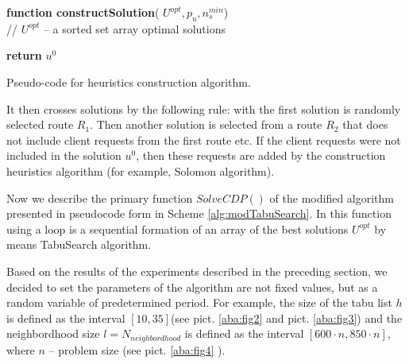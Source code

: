 \documentclass[]{TAACpaper}
\begin{document}
\begin{algorithm}[H]

	\textbf{function constructSolution}( $U^{opt}, p_u, n^{min}_s$) \\
	// $U^{opt}$ -- a sorted set array optimal solutions \\
	
	
	
	
	
	\textbf{return} $u^0$
	
	\caption{Pseudo-code for heuristics construction algorithm.}
	\label{alg:constructSolution}
\end{algorithm}

It then crosses solutions by the following rule: with the first solution is randomly selected route $R_1$. Then another solution is selected from a route $R_2$ that does not include client requests from the first  route etc. If the client requests were not included in the solution $u^0$, then these requests are added by the construction heuristics algorithm (for example, Solomon algorithm).


Now we describe the primary function $SolveCDP()$ of the modified algorithm presented in pseudocode form in Scheme \ref{alg:modTabuSearch}. In this function using a loop is a sequential formation of an array of the best solutions $U^{opt}$ by means TabuSearch algorithm.   

Based on the results of the experiments described in the preceding section, we decided to set the parameters of the algorithm are not fixed values, but as a random variable of predetermined period. For example, the size of the tabu list $h$ is defined as the interval $[10,35]$(see pict. \ref{aba:fig2} and  pict. \ref{aba:fig3}) and the neighbordhood size $l=N_{neighbordhood}$ is defined as the interval $[600\cdot n,850\cdot n]$, where $n$ -- problem size (see pict. \ref{aba:fig4} ).
\end{document}
